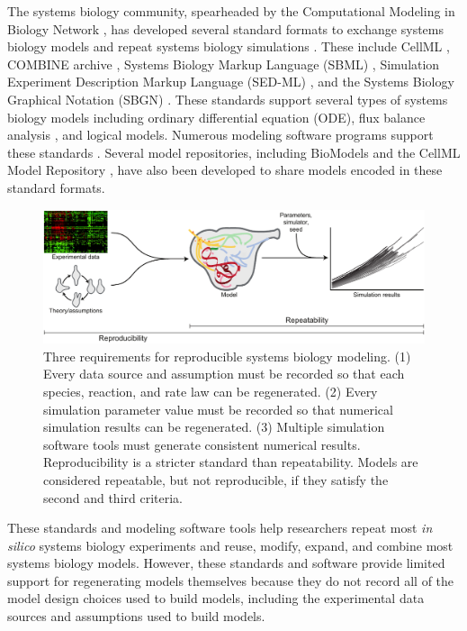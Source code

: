 \documentclass[journal,transmag,twoside]{IEEEtran}
\begin{document}
The systems biology community, spearheaded by the Computational Modeling in Biology Network \cite{hucka2015promoting}, has developed several standard formats to exchange systems biology models and repeat systems biology simulations \cite{drager2014improving}. These include CellML \cite{cuellar2003overview}, COMBINE archive \cite{COMBINE2012}, Systems Biology Markup Language (SBML) \cite{hucka2003}, Simulation Experiment Description Markup Language (SED-ML) \cite{sedml2011}, and the Systems Biology Graphical Notation (SBGN) \cite{LeNovereHMMSS09}. These standards support several types of systems biology models including ordinary differential equation (ODE), flux balance analysis \cite{orth2010flux}, and logical models. Numerous modeling software programs support these standards \cite{hucka2011profile}. Several model repositories,  including BioModels \cite{chelliah2015biomodels} and the CellML Model Repository \cite{lloyd2008cellml}, have also been developed to share models encoded in these standard formats. 

\begin{figure}[!tb]
\centering
\includegraphics[width=\textwidth]{figure1/figure1}
\caption{Three requirements for reproducible systems biology modeling. (1) Every data source and assumption must be recorded so that each species, reaction, and rate law can be regenerated. (2) Every simulation parameter value must be recorded so that numerical simulation results can be regenerated. (3) Multiple simulation software tools must generate consistent numerical results. Reproducibility is a stricter standard than repeatability. Models are considered repeatable, but not reproducible, if they satisfy the second and third criteria.}
\label{fig_repro_diagram}
\end{figure}

These standards and modeling software tools help researchers repeat most \textit{in silico} systems biology experiments and reuse, modify, expand, and combine most systems biology models. However, these standards and software provide limited support for regenerating models themselves because they do not record all of the model design choices used to build models, including the experimental data sources and assumptions used to build models.
\end{document}
